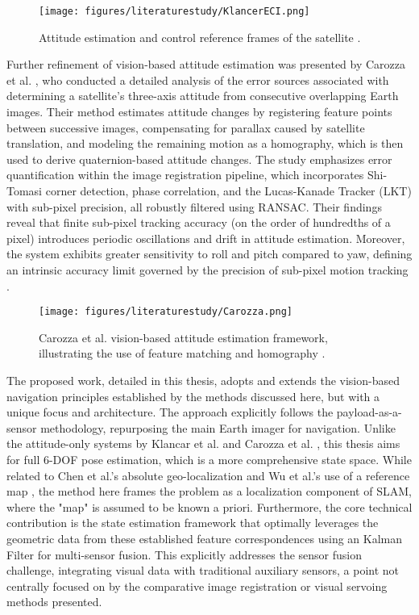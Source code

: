 \begin{figure}[H]
    \centering
    \texttt{[image: figures/literaturestudy/KlancerECI.png]}
    \caption{Attitude estimation and control reference frames of the satellite \cite{Klancar2012}.}
    \label{fig:visual_pipeline_klancar}
\end{figure}

\noindent
Further refinement of vision-based attitude estimation was presented by Carozza et al. \cite{Carozza2013}, who conducted a detailed analysis of the error sources associated with determining a satellite's three-axis attitude from consecutive overlapping Earth images. Their method estimates attitude changes by registering feature points between successive images, compensating for parallax caused by satellite translation, and modeling the remaining motion as a homography, which is then used to derive quaternion-based attitude changes. The study emphasizes error quantification within the image registration pipeline, which incorporates Shi-Tomasi corner detection, phase correlation, and the Lucas-Kanade Tracker (LKT) with sub-pixel precision, all robustly filtered using RANSAC. Their findings reveal that finite sub-pixel tracking accuracy (on the order of hundredths of a pixel) introduces periodic oscillations and drift in attitude estimation. Moreover, the system exhibits greater sensitivity to roll and pitch compared to yaw, defining an intrinsic accuracy limit governed by the precision of sub-pixel motion tracking \cite{Carozza2013}.

\begin{figure}[H]
    \centering
    \texttt{[image: figures/literaturestudy/Carozza.png]}
    \caption{Carozza et al. vision-based attitude estimation framework, illustrating the use of feature matching and homography \cite{Carozza2013}.}
    \label{fig:visual_pipeline_carozza}
\end{figure}

\noindent
The proposed work, detailed in this thesis, adopts and extends the vision-based navigation principles established by the methods discussed here, but with a unique focus and architecture. The approach explicitly follows the payload-as-a-sensor methodology, repurposing the main Earth imager for navigation. Unlike the attitude-only systems by Klancar et al. and Carozza et al. \cite{Klancar2012, Carozza2013}, this thesis aims for full 6-DOF pose estimation, which is a more comprehensive state space. While related to Chen et al.'s absolute geo-localization and Wu et al.'s use of a reference map \cite{Wu2024, Chen2021}, the method here frames the problem as a localization component of SLAM, where the "map" is assumed to be known a priori. Furthermore, the core technical contribution is the state estimation framework that optimally leverages the geometric data from these established feature correspondences using an  Kalman Filter for multi-sensor fusion. This explicitly addresses the sensor fusion challenge, integrating visual data with traditional auxiliary sensors, a point not centrally focused on by the comparative image registration or visual servoing methods presented.

